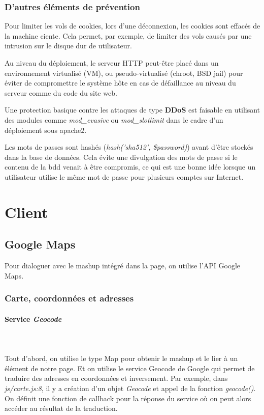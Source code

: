 \documentclass[a4paper]{article}
\begin{document}
\subsubsection{D'autres éléments de prévention}

Pour limiter les vols de cookies, lors d'une déconnexion, les cookies sont
effacés de la machine ciente. Cela permet, par exemple, de limiter des vols
causés par une intrusion sur le disque dur de utilisateur.

Au niveau du déploiement, le serveur HTTP peut-être placé dans un environnement
virtualisé (VM), ou pseudo-virtualisé (chroot, BSD jail) pour éviter de compromettre
le système hôte en cas de défaillance au niveau du serveur comme du code du site
web.

Une protection basique contre les attaques de type \textbf{DDoS} est faisable en
utilisant des modules comme \textit{mod\_evasive} ou \textit{mod\_slotlimit} dans
le cadre d'un déploiement sous apache$2$.

Les mots de passes sont hashés (\textit{hash('sha512', \$password)}) avant d'être
stockés dans la base de données. Cela évite une divulgation des mots de passe si
le contenu de la bdd venait à être compromis, ce qui est une bonne idée lorsque
un utilisateur utilise le même mot de passe pour plusieurs comptes sur Internet.

\section{Client}
\subsection{Google Maps}

Pour dialoguer avec le mashup intégré dans la page, on utilise l'API Google Maps.

\subsubsection{Carte, coordonnées et adresses}

\paragraph{Service \textit{Geocode}}
~~\\
\\
Tout d'abord, on utilise le type Map pour obtenir le mashup et le lier à un élément 
de notre page.
Et on utilise le service Geocode de Google qui permet de traduire 
des adresses en coordonnées et inversement.
Par exemple, dans \textit{js/carte.js:8}, il y a création d'un objet \textit{Geocode} 
et appel de la fonction \textit{geocode()}. On définit une fonction de callback pour 
la réponse du service où on peut alors accéder au résultat de la traduction.
\end{document}
